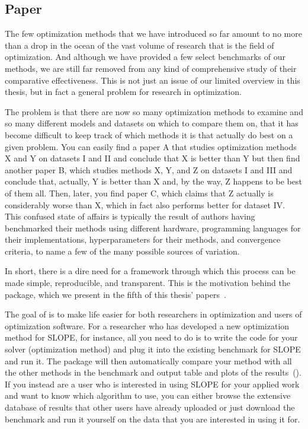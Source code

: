 \subsection{Paper \IV}

The few optimization methods that we have introduced so far amount to no more than a drop in the ocean of the vast volume of research that is the field of optimization. And although we have provided a few select benchmarks of our methods, we are still far removed from any kind of comprehensive study of their comparative effectiveness. This is not just an issue of our limited overview in this thesis, but in fact a general problem for research in optimization.

The problem is that there are now so many optimization methods to examine and so many different models and datasets on which to compare them on, that it has become difficult to keep track of which methods it is that actually do best on a given problem. You can easily find a paper A that studies optimization methods X and Y on datasets I and II and conclude that X is better than Y but then find another paper B, which studies methods X, Y, and Z on datasets I and III and conclude that, actually, Y is better than X and, by the way, Z happens to be best of them all. Then, later, you find paper C, which claims that Z actually is considerably worse than X, which in fact also performs better for dataset IV. This confused state of affairs is typically the result of authors having benchmarked their methods using different hardware, programming languages for their implementations, hyperparameters for their methods, and convergence criteria, to name a few of the many possible sources of variation.

In short, there is a dire need for a framework through which this process can be made simple, reproducible, and transparent. This is the motivation behind the  package, which we present in the fifth of this thesis' papers~\parencite{moreau2022a}.

The goal of  is to make life easier for both researchers in optimization and users of optimization software. For a researcher who has developed a new optimization method for SLOPE, for instance, all you need to do is to write the code for your solver (optimization method) and plug it into the existing  benchmark for SLOPE and run it. The package will then automatically compare your method with all the other methods in the benchmark and output table and plots of the results~(). If you instead are a user who is interested in using SLOPE for your applied work and want to know which algorithm to use, you can either browse the extensive database of results that other users have already uploaded or just download the benchmark and run it yourself on the data that you are interested in using it for.

